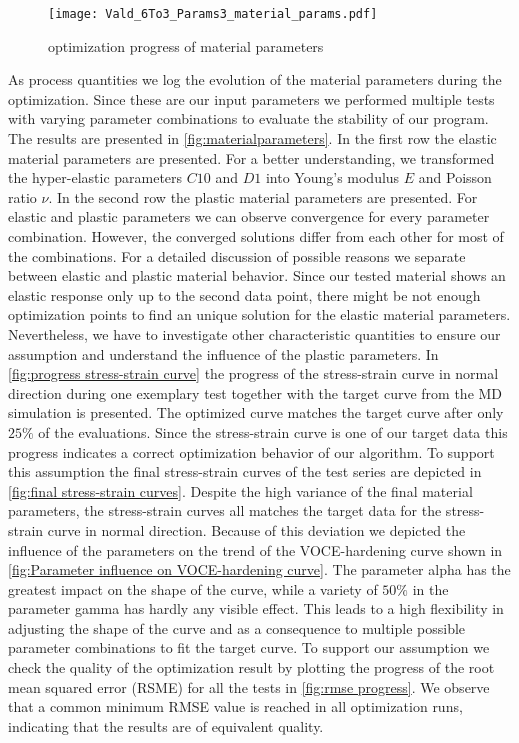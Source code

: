     \begin{figure}[H]
		\centering
        \texttt{[image: Vald\_6To3\_Params3\_material\_params.pdf]}
		\caption{optimization progress of material parameters}
		\label{fig:verifMaterialParams}
	\end{figure}
    As process quantities we log the evolution of the material parameters during the optimization. Since these are our input parameters we performed multiple tests with varying parameter combinations to evaluate the stability of our program. The results are presented in \ref{fig:materialparameters}. In the first row the elastic material parameters are presented. For a better understanding, we transformed the hyper-elastic parameters \(C10\) and \(D1\) into Young's modulus \(E\) and Poisson ratio \(\nu\). In the second row the plastic material parameters are presented. For elastic and plastic parameters we can observe convergence for every parameter combination. However, the converged solutions differ from each other for most of the combinations. 
    For a detailed discussion of possible reasons we separate between elastic and plastic material behavior. Since our tested material shows an elastic response only up to the second data point, there might be not enough optimization points to find an unique solution for the elastic material parameters. Nevertheless, we have to investigate other characteristic quantities to ensure our assumption and understand the influence of the plastic parameters. In \autoref{fig:progress stress-strain curve} the progress of the stress-strain curve in normal direction during one exemplary test together with the target curve from the MD simulation is presented. The optimized curve matches the target curve after only  \(25 \%\) of the evaluations. Since the stress-strain curve is one of our target data this progress indicates a correct optimization behavior of our algorithm. To support this assumption the final stress-strain curves of the test series are depicted in \autoref{fig:final stress-strain curves}. Despite the high variance of the final material parameters, the stress-strain curves all matches the target data for the stress-strain curve in normal direction. Because of this deviation we depicted the influence of the parameters on the trend of the VOCE-hardening curve shown in \autoref{fig:Parameter influence on VOCE-hardening curve}. The parameter alpha has the greatest impact on the shape of the curve, while a variety of \(50\%\) in the parameter gamma has hardly any visible effect. This leads to a high flexibility in adjusting the shape of the curve and as a consequence to multiple possible parameter combinations to fit the target curve. To support our assumption we check the quality of the optimization result by plotting the progress of the root mean squared error (RSME) for all the tests in \autoref{fig:rmse progress}. We observe that a common minimum RMSE value is reached in all optimization runs, indicating that the results are of equivalent quality. 
